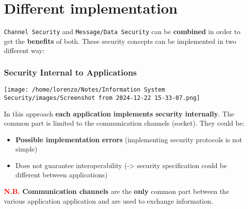 \section{Different implementation}
\texttt{Channel Security} and \texttt{Message/Data Security} can be \textbf{combined} in order to get the \textbf{benefits} of both. These security concepts can be  implemented in two different way:
\\
\newline
\begin{minipage}{0.5\textwidth}
    \subsubsection{Security Internal to Applications}
    \begin{center}
        \texttt{[image: /home/lorenzo/Notes/Information System Security/images/Screenshot from 2024-12-22 15-33-07.png]}
    \end{center}
    In this approach \textbf{each application implements security internally}. The common part is limited to the communication channels (socket). They could be:
    \begin{itemize}
        \item  \textbf{Possible implementation errors} (implementing security protocols is not simple)
        \item Does not guarantee interoperability (-> security specification could be different between applications)
    \end{itemize}
    \textcolor{red}{\textbf{N.B.}} \textbf{Communication channels} are the \textbf{only} common part between the various application application and are used to exchange information.
\end{minipage} 
\hspace{0.5cm}
